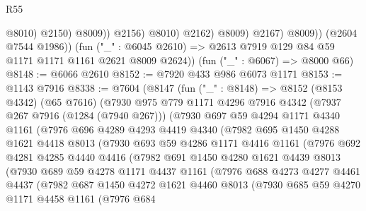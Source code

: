 \begin{lexlean}{R55}
\begin{coremodule}
                              @8010)
                            @2150)
                          @8009))
                      @2156)
                    @8010)
                  @2162)
                @8009)
              @2167)
            @8009))
        (@2604 @7544 @1986))
      (fun ("_" : @6045 @2610) => @2613 @7919 @129 @84 @59 @1171 @1171 @1161 @2621 @8009 @2624))
    (fun ("_" : @6067) => @8000 @66)
@8148 := @6066 @2610
@8152 := @7920 @433 @986 @6073 @1171
@8153 := @1143 @7916
@8338 := @7604
    (@8147
      (fun ("_" : @8148) =>
      @8152
        (@8153 @4342)
        (@65 @7616)
        (@7930
          @975
          @779
          @1171
          @4296
          @7916
          @4342
          (@7937 @267 @7916 (@1284 (@7940 @267)))
          (@7930
            @697
            @59
            @4294
            @1171
            @4340
            @1161
            (@7976
              @696
              @4289
              @4293
              @4419
              @4340
              (@7982
                @695
                @1450
                @4288
                @1621
                @4418
                @8013
                (@7930
                  @693
                  @59
                  @4286
                  @1171
                  @4416
                  @1161
                  (@7976
                    @692
                    @4281
                    @4285
                    @4440
                    @4416
                    (@7982
                      @691
                      @1450
                      @4280
                      @1621
                      @4439
                      @8013
                      (@7930
                        @689
                        @59
                        @4278
                        @1171
                        @4437
                        @1161
                        (@7976
                          @688
                          @4273
                          @4277
                          @4461
                          @4437
                          (@7982
                            @687
                            @1450
                            @4272
                            @1621
                            @4460
                            @8013
                            (@7930
                              @685
                              @59
                              @4270
                              @1171
                              @4458
                              @1161
                              (@7976
                                @684

\end{coremodule}
\end{lexlean}
